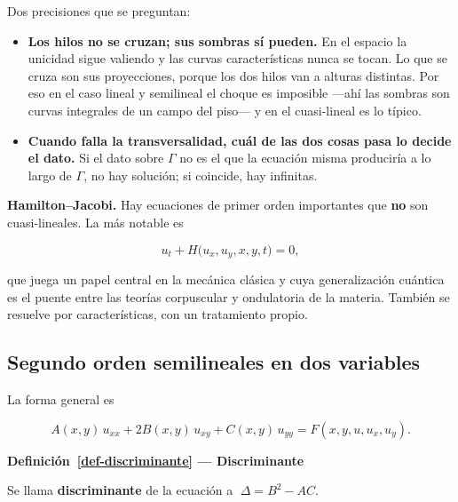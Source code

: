 \documentclass[
  spanish,
  a4paper,
]{scrbook}
\providecommand{\tightlist}{%
  \setlength{\itemsep}{0pt}\setlength{\parskip}{0pt}}
\theoremstyle{definition}
\theoremstyle{plain}
\theoremstyle{definition}
\theoremstyle{plain}
\theoremstyle{definition}
\theoremstyle{remark}
\begin{document}
Dos precisiones que se preguntan:

\begin{itemize}
\tightlist
\item
  \textbf{Los hilos no se cruzan; sus sombras sí pueden.} En el espacio
  la unicidad sigue valiendo y las curvas características nunca se
  tocan. Lo que se cruza son sus proyecciones, porque los dos hilos van
  a alturas distintas. Por eso en el caso lineal y semilineal el choque
  es imposible ---ahí las sombras son curvas integrales de un campo del
  piso--- y en el cuasi-lineal es lo típico.
\item
  \textbf{Cuando falla la transversalidad, cuál de las dos cosas pasa lo
  decide el dato.} Si el dato sobre \(\Gamma\) no es el que la ecuación
  misma produciría a lo largo de \(\Gamma\), no hay solución; si
  coincide, hay infinitas.
\end{itemize}

\textbf{Hamilton--Jacobi.} Hay ecuaciones de primer orden importantes
que \textbf{no} son cuasi-lineales. La más notable es

\[
u_t + H\big(u_x, u_y, x, y, t\big) = 0 ,
\]

que juega un papel central en la mecánica clásica y cuya generalización
cuántica es el puente entre las teorías corpuscular y ondulatoria de la
materia. También se resuelve por características, con un tratamiento
propio.

\subsection{Segundo orden semilineales en dos
variables}\label{sec-resumen-5}

La forma general es

\[
A(x,y)\,u_{xx} + 2B(x,y)\,u_{xy} + C(x,y)\,u_{yy} = F(x,y,u,u_x,u_y) .
\]

\begin{tcolorbox}[enhanced jigsaw, arc=.35mm, bottomrule=.15mm, breakable, colback=white, colframe=quarto-callout-note-color-frame, left=2mm, leftrule=.75mm, opacityback=0, rightrule=.15mm, toprule=.15mm]
\begin{minipage}[t]{5.5mm}
\textcolor{quarto-callout-note-color}{\faInfo}
\end{minipage}%
\begin{minipage}[t]{\textwidth - 5.5mm}

\vspace{-3mm}\textbf{Definición~\ref{def-discriminante} --- Discriminante}\vspace{3mm}

Se llama \textbf{discriminante} de la ecuación a
\(\;\Delta = B^2 - AC\).

\end{minipage}%
\end{tcolorbox}
\end{document}
